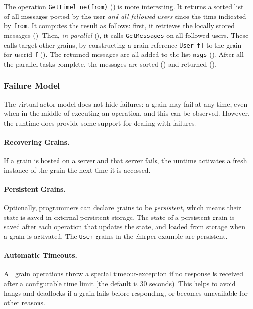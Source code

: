 The operation  \lstinline|GetTimeline(from)|  () is more interesting. It returns a sorted list of all messages posted by the user \emph{and all followed users} since  the time indicated by \lstinline|from|. It computes the result as follows: first, it retrieves the locally stored messages (). Then, \emph{in parallel} (), it calls \lstinline|GetMessages| on all followed users. These calls target other grains, by constructing a grain reference \lstinline|User[f]| to the grain for userid \lstinline|f| (). The returned messages are all added to the list \lstinline|msgs| (). After all the parallel tasks complete, the messages are sorted () and returned ().

\subsubsection{Failure Model}

The virtual actor model does not hide failures: a grain may fail at any time, even when in the middle of executing an operation, and this can be observed. However, the runtime does provide some support for dealing with failures.

\paragraph{Recovering Grains.} If a grain is hosted on a server and that server fails, the runtime activates a fresh instance of the grain the next time it is accessed. 

\paragraph{Persistent Grains.} Optionally, programmers can declare grains to be \emph{persistent}, which means their state is saved in external persistent storage. The state of a persistent grain is saved after each operation that updates the state, and loaded from storage when a grain is activated. The \lstinline|User| grains in the chirper example are persistent. 

\paragraph{Automatic Timeouts.} All grain operations throw a special timeout-exception if no response is received after a configurable time limit (the default is 30 seconds). This helps to avoid hangs and deadlocks if a grain fails before responding, or becomes unavailable for other reasons.

